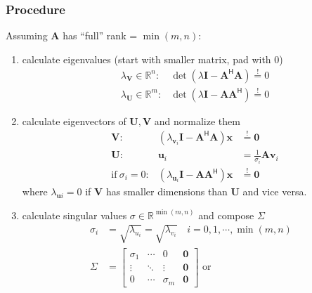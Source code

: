 \subsubsection{Procedure}
Assuming $\mathbf{A}$ has ``full'' rank = $\min(m,n)$:
\begin{enumerate}
    \item calculate eigenvalues (start with smaller matrix, pad with 0)
          \noindent\begin{align*}
               & \lambda_{\mathbf{V}}\in \mathbb{R}^n: & \det\left(\lambda \mathbf{I}-\mathbf{A}^{\mathsf{H}}\mathbf{A}\right)\overset{!}{=}0 \\
               & \lambda_{\mathbf{U}}\in \mathbb{R}^m: & \det\left(\lambda \mathbf{I}-\mathbf{AA}^{\mathsf{H}}\right)\overset{!}{=}0
          \end{align*}
    \item calculate eigenvectors of $\mathbf{U},\mathbf{V}$ and normalize them
          \noindent\begin{align*}
               & \mathbf{V}:                & \left(\lambda_{\mathbf{v}_i} \mathbf{I} -\mathbf{A}^{\mathsf{H}} \mathbf{A}\right)\mathbf{x} & \overset{!}{=}\mathbf{0}          \\
               & \mathbf{U}:                & \mathbf{u}_i                                                                                 & = \frac{1}{\sigma_i}\mathbf{Av}_i \\
               & \mathrm{if}~\sigma_i = 0 : & \left(\lambda_{\mathbf{u}_i} \mathbf{I} -\mathbf{AA}^{\mathsf{H}}\right)\mathbf{x}           & \overset{!}{=}\mathbf{0}
          \end{align*}
          where $\lambda_{\mathbf{u}i}=0$ if $\mathbf{V}$ has smaller dimensions than $\mathbf{U}$ and vice versa.
    \item calculate singular values $\sigma\in \mathbb{R}^{\min(m,n)}$ and compose $\Sigma$
          \noindent\begin{align*}
              \sigma_i & = \sqrt{\lambda_{u_i}} = \sqrt{\lambda_{v_i}}\quad i=0,1,\cdots, \min(m,n) \\
              \Sigma   & = \begin{bmatrix}
                               \sigma_1 & \cdots & 0          & \mathbf{0} \\
                               \vdots   & \ddots & \vdots     & \mathbf{0} \\
                               0        & \cdots & \sigma_{m} & \mathbf{0}
                           \end{bmatrix}\text{ or }

\end{align*}
\end{enumerate}
